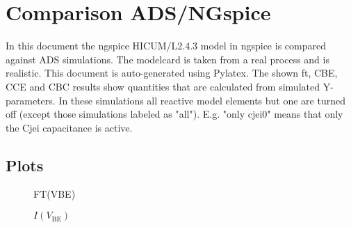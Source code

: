 \documentclass{article}%
\begin{document}
%
\normalsize%
\section{Comparison ADS/NGspice}%
\label{sec:ComparisonADS/NGspice}%
In this document the ngspice HICUM/L2.4.3 model in ngspice is compared against ADS simulations. The modelcard is taken from a real process and is realistic. This document is auto-generated using Pylatex. The shown ft, CBE, CCE and CBC results show quantities that are calculated from simulated Y-parameters. In these simulations all reactive model elements but one are turned off (except those simulations labeled as "all"). E.g. "only cjei0" means that only the Cjei capacitance is active.%
\subsection{Plots}%
\label{subsec:Plots}%


\begin{figure}[h!]%
%
\caption{FT(VBE)}%
\label{FT(VBE)}%
\end{figure}

%


\begin{figure}[h!]%
%
\caption{$I(V_{\mathrm{BE}})$}%
\label{I(V_BE)}%
\end{figure}

%
\end{document}
